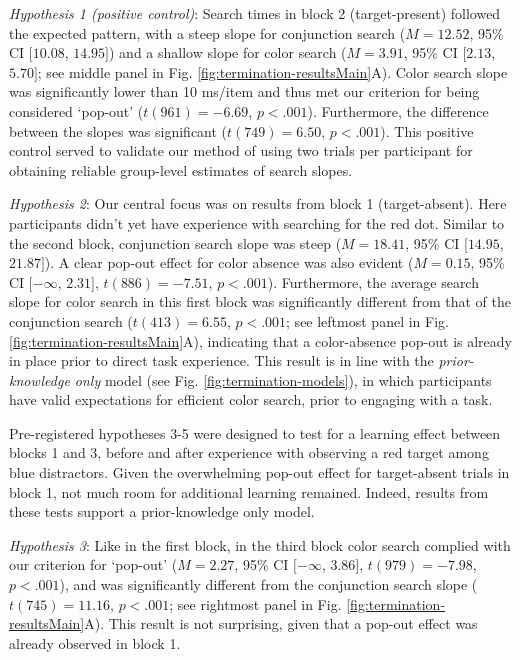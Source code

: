 \documentclass[12pt,twoside]{reedthesis}
\begin{document}
\emph{Hypothesis 1 (positive control)}: Search times in block 2 (target-present) followed the expected pattern, with a steep slope for conjunction search (\(M = 12.52\), 95\% CI \([10.08\), \(14.95]\)) and a shallow slope for color search (\(M = 3.91\), 95\% CI \([2.13\), \(5.70]\); see middle panel in Fig. \ref{fig:termination-resultsMain}A). Color search slope was significantly lower than 10 ms/item and thus met our criterion for being considered `pop-out' (\(t(961) = -6.69\), \(p < .001\)). Furthermore, the difference between the slopes was significant (\(t(749) = 6.50\), \(p < .001\)). This positive control served to validate our method of using two trials per participant for obtaining reliable group-level estimates of search slopes.

\emph{Hypothesis 2}: Our central focus was on results from block 1 (target-absent). Here participants didn't yet have experience with searching for the red dot. Similar to the second block, conjunction search slope was steep (\(M = 18.41\), 95\% CI \([14.95\), \(21.87]\)). A clear pop-out effect for color absence was also evident (\(M = 0.15\), 95\% CI \([-\infty\), \(2.31]\), \(t(886) = -7.51\), \(p < .001\)). Furthermore, the average search slope for color search in this first block was significantly different from that of the conjunction search (\(t(413) = 6.55\), \(p < .001\); see leftmost panel in Fig. \ref{fig:termination-resultsMain}A), indicating that a color-absence pop-out is already in place prior to direct task experience. This result is in line with the \emph{prior-knowledge only} model (see Fig. \ref{fig:termination-models}), in which participants have valid expectations for efficient color search, prior to engaging with a task.

Pre-registered hypotheses 3-5 were designed to test for a learning effect between blocks 1 and 3, before and after experience with observing a red target among blue distractors. Given the overwhelming pop-out effect for target-absent trials in block 1, not much room for additional learning remained. Indeed, results from these tests support a prior-knowledge only model.

\emph{Hypothesis 3}: Like in the first block, in the third block color search complied with our criterion for `pop-out' (\(M = 2.27\), 95\% CI \([-\infty\), \(3.86]\), \(t(979) = -7.98\), \(p < .001\)), and was significantly different from the conjunction search slope (\(t(745) = 11.16\), \(p < .001\); see rightmost panel in Fig. \ref{fig:termination-resultsMain}A). This result is not surprising, given that a pop-out effect was already observed in block 1.
\end{document}
